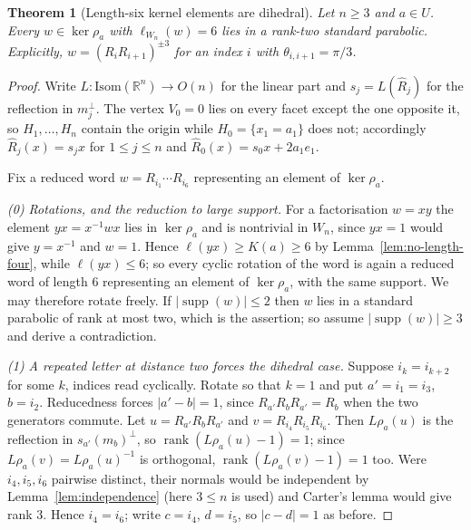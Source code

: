 \documentclass[11pt,a4paper]{article}
\newcommand{\R}{\mathbb{R}}
\newcommand{\Isom}{\mathrm{Isom}}
\newtheorem{theorem}{Theorem}
\theoremstyle{definition}
\theoremstyle{remark}
\theoremstyle{plain}
\begin{document}
\begin{theorem}[Length-six kernel elements are dihedral]\label{thm:len6}
Let $n\ge3$ and $a\in U$. Every $w\in\ker\rho_a$ with $\ell_{W_n}(w)=6$ lies in a rank-two
standard parabolic. Explicitly, $w=(R_iR_{i+1})^{\pm3}$ for an index $i$ with
$\theta_{i,i+1}=\pi/3$.
\end{theorem}

\begin{proof}
Write $L\colon\Isom(\R^n)\to O(n)$ for the linear part and $s_j=L(\widehat R_j)$ for the
reflection in $m_j^{\perp}$. The vertex $V_0=0$ lies on every facet except the one opposite it,
so $H_1,\dots,H_n$ contain the origin while $H_0=\{x_1=a_1\}$ does not; accordingly
$\widehat R_j(x)=s_jx$ for $1\le j\le n$ and $\widehat R_0(x)=s_0x+2a_1e_1$.

Fix a reduced word $w=R_{i_1}\cdots R_{i_6}$ representing an element of $\ker\rho_a$.

\emph{(0) Rotations, and the reduction to large support.} For a factorisation $w=xy$ the
element $yx=x^{-1}wx$ lies in $\ker\rho_a$ and is nontrivial in $W_n$, since $yx=1$ would give
$y=x^{-1}$ and $w=1$. Hence $\ell(yx)\ge K(a)\ge6$ by Lemma~\ref{lem:no-length-four}, while
$\ell(yx)\le6$; so every cyclic rotation of the word is again a reduced word of length $6$
representing an element of $\ker\rho_a$, with the same support. We may therefore rotate freely.
If $|\operatorname{supp}(w)|\le2$ then $w$ lies in a standard parabolic of rank at most two,
which is the assertion; so assume $|\operatorname{supp}(w)|\ge3$ and derive a contradiction.

\emph{(1) A repeated letter at distance two forces the dihedral case.} Suppose
$i_k=i_{k+2}$ for some $k$, indices read cyclically. Rotate so that $k=1$ and put
$a'=i_1=i_3$, $b=i_2$. Reducedness forces $|a'-b|=1$, since $R_{a'}R_bR_{a'}=R_b$ when the two
generators commute. Let $u=R_{a'}R_bR_{a'}$ and $v=R_{i_4}R_{i_5}R_{i_6}$. Then $L\rho_a(u)$ is
the reflection in $s_{a'}(m_b)^{\perp}$, so $\operatorname{rank}(L\rho_a(u)-1)=1$; since
$L\rho_a(v)=L\rho_a(u)^{-1}$ is orthogonal, $\operatorname{rank}(L\rho_a(v)-1)=1$ too. Were
$i_4,i_5,i_6$ pairwise distinct, their normals would be independent by
Lemma~\ref{lem:independence} (here $3\le n$ is used) and Carter's lemma would give rank $3$.
Hence $i_4=i_6$; write $c=i_4$, $d=i_5$, so $|c-d|=1$ as before.


\end{proof}
\end{document}
